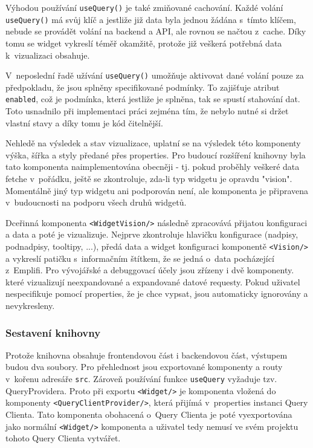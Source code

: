 \documentclass[czech, bc, kiv, he, iso690numb]{fasthesis}
\begin{document}
Výhodou používání \texttt{useQuery()} je také zmiňované cachování. Každé volání \texttt{useQuery()} má svůj klíč a jestliže již data byla jednou žádána s~tímto klíčem,
nebude se provádět volání na backend a API, ale rovnou se načtou z~cache. Díky tomu se widget vykreslí téměř okamžitě, protože již veškerá potřebná data k~vizualizaci obsahuje. 

V~neposlední řadě užívání \texttt{useQuery()} umožňuje aktivovat dané volání pouze za předpokladu, že jsou splněny specifikované podmínky. To zajišťuje atribut \texttt{enabled},
což je podmínka, která jestliže je splněna, tak se spustí stahování dat. Toto usnadnilo při implementaci práci zejména tím, že nebylo nutné si držet vlastní stavy a díky tomu
je kód čitelnější.

Nehledě na výsledek a stav vizualizace, uplatní se na výsledek této komponenty výška, šířka a styly předané přes properties. Pro budoucí rozšíření knihovny byla tato komponenta
naimplementována obecněji - tj. pokud proběhly veškeré data fetche v~pořádku, ještě se zkontroluje, zda-li typ widgetu je opravdu "vision". Momentálně jiný typ widgetu ani podporován není,
ale komponenta je připravena v~budoucnosti na podporu všech druhů widgetů.


Dceřinná komponenta \texttt{<WidgetVision/>} následně zpracovává přijatou konfiguraci a data a poté je vizualizuje. Nejprve zkontroluje hlavičku konfigurace (nadpisy, podnadpisy, tooltipy, ...),
předá data a widget konfiguraci komponentě \texttt{<Vision/>} a vykreslí patičku s~informačním štítkem, že se jedná o~data pocházející z~Emplifi. Pro vývojářské a debuggovací účely jsou 
zřízeny i dvě komponenty. které vizualizují neexpandované a expandované datové requesty. Pokud uživatel nespecifikuje pomocí properties, že je chce vypsat, jsou automaticky ignorovány a nevykresleny.

\subsubsection{Sestavení knihovny}

Protože knihovna obsahuje frontendovou část i backendovou část, výstupem budou dva soubory. Pro přehlednost jsou exportované komponenty a routy v~kořenu adresáře \texttt{src}. Zároveň používání
funkce \texttt{useQuery} vyžaduje tzv. QueryProvidera. Proto při exportu \texttt{<Widget/>} je komponenta vložená do komponenty \texttt{<QueryClientProvider/>}, která přijímá v~properties instanci
Query Clienta. Tato komponenta obohacená o~Query Clienta je poté vyexportována jako normální \texttt{<Widget/>} komponenta a uživatel tedy nemusí ve svém projektu tohoto Query Clienta vytvářet.
\end{document}
